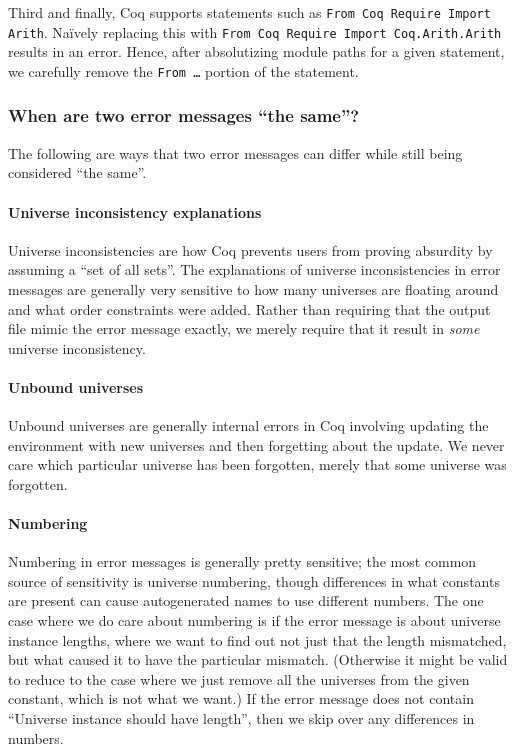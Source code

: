 \documentclass[a4paper,USenglish,cleveref,autoref,thm-restate]{lipics-v2021}
\begin{document}
Third and finally, Coq supports statements such as \verb|From Coq Require Import Arith|.
Na\"ively replacing this with \verb|From Coq Require Import Coq.Arith.Arith| results in an error.
Hence, after absolutizing module paths for a given statement, we carefully remove the \texttt{From \ldots} portion of the statement.

\subsubsection{When are two error messages ``the same''?}
The following are ways that two error messages can differ while still being considered ``the same''.

\paragraph{Universe inconsistency explanations}
Universe inconsistencies are how Coq prevents users from proving absurdity by assuming a ``set of all sets''.
The explanations of universe inconsistencies in error messages are generally very sensitive to how many universes are floating around and what order constraints were added.
Rather than requiring that the output file mimic the error message exactly, we merely require that it result in \emph{some} universe inconsistency.

\paragraph{Unbound universes}
Unbound universes are generally internal errors in Coq involving updating the environment with new universes and then forgetting about the update.
We never care which particular universe has been forgotten, merely that some universe was forgotten.

\paragraph{Numbering}
Numbering in error messages is generally pretty sensitive; the most common source of sensitivity is universe numbering, though differences in what constants are present can cause autogenerated names to use different numbers.
The one case where we do care about numbering is if the error message is about universe instance lengths, where we want to find out not just that the length mismatched, but what caused it to have the particular mismatch.
(Otherwise it might be valid to reduce to the case where we just remove all the universes from the given constant, which is not what we want.)
If the error message does not contain ``Universe instance should have length'', then we skip over any differences in numbers.
\end{document}
